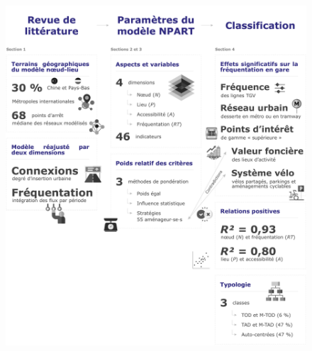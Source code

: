 \begin{refsegment}
\begin{figure}[h!]\vspace*{4pt}
        \caption*{}
        \label{graphical-abstract-chap6}
        \centerline{\includegraphics[width=1\columnwidth]{src/Figures/Graphical-abstract/FR_Graphical_abstract_chap6.pdf}}
        \vspace{5pt}
    \end{figure}


\end{refsegment}
